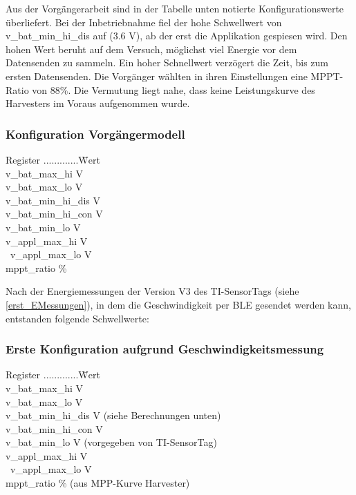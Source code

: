 Aus der Vorgängerarbeit sind in der Tabelle unten notierte Konfigurationswerte überliefert. Bei der Inbetriebnahme fiel der hohe Schwellwert von v\_bat\_min\_hi\_dis auf (3.6 V), ab der erst die Applikation gespiesen wird. Den hohen Wert beruht auf dem Versuch, möglichst viel Energie vor dem Datensenden zu sammeln. Ein hoher Schnellwert verzögert die Zeit, bis zum ersten Datensenden. Die Vorgänger wählten in ihren Einstellungen eine MPPT-Ratio von 88\thinspace\%. Die Vermutung liegt nahe, dass keine Leistungskurve des Harvesters im Voraus aufgenommen wurde.

\subsubsection*{Konfiguration Vorgängermodell}
\begin{tabbing}
    Register .............\quad\= Wert \\[0.8ex]
    v\_bat\_max\_hi        V \\
    v\_bat\_max\_lo        V \\
    v\_bat\_min\_hi\_dis   V \\
    v\_bat\_min\_hi\_con   V \\
    v\_bat\_min\_lo        V \\
    v\_appl\_max\_hi       V \\\
    v\_appl\_max\_lo       V \\ 
    mppt\_ratio            \thinspace\% \\
\end{tabbing}

Nach der Energiemessungen der Version V3 des TI-SensorTags (siehe \ref{erst_EMessungen}), in dem die Geschwindigkeit per BLE gesendet werden kann, entstanden folgende Schwellwerte:

\subsubsection*{Erste Konfiguration aufgrund Geschwindigkeitsmessung}
\begin{tabbing}
    Register .............\quad\= Wert \\[0.8ex]
    v\_bat\_max\_hi        V \\
    v\_bat\_max\_lo        V \\
    v\_bat\_min\_hi\_dis   V (siehe Berechnungen unten)\\
    v\_bat\_min\_hi\_con   V \\
    v\_bat\_min\_lo        V (vorgegeben von TI-SensorTag)\\
    v\_appl\_max\_hi      \> 3.8 V \\\
    v\_appl\_max\_lo       V \\ 
    mppt\_ratio            \> 50\thinspace\% (aus MPP-Kurve Harvester)\\
\end{tabbing}

